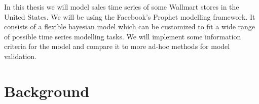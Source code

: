 \documentclass[english, 12pt, a4paper, sci, utf8, a-1b, online]{aaltothesis}
\begin{document}
In this thesis we will model sales time series of some Wallmart stores in the United States. We will be using 
the Facebook's Prophet modelling framework. It consists of a flexible bayesian model which can be customized 
to fit a wide range of possible time series modelling tasks. We will implement some information criteria 
for the model and compare it to more ad-hoc methods for model validation. 



\section{Background}






\end{document}
